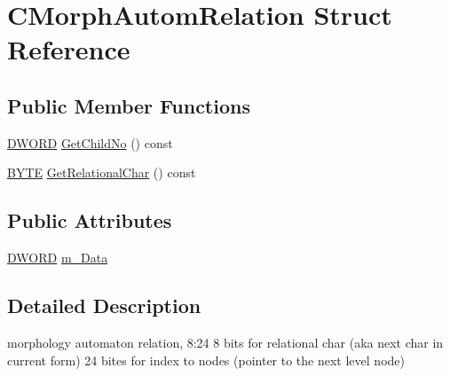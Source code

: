 \hypertarget{structCMorphAutomRelation}{\section{C\-Morph\-Autom\-Relation Struct Reference}
\label{structCMorphAutomRelation}
}
\subsection*{Public Member Functions}
\begin{DoxyCompactItemize}
\item 
\hyperlink{sphinxstd_8h_a798af1e30bc65f319c1a246cecf59e39}{D\-W\-O\-R\-D} \hyperlink{structCMorphAutomRelation_a7b515e898722b2a93acf82d0ebaad702}{Get\-Child\-No} () const 
\item 
\hyperlink{sphinxstd_8h_a4ae1dab0fb4b072a66584546209e7d58}{B\-Y\-T\-E} \hyperlink{structCMorphAutomRelation_a3516b6fb20e3932efe70228eb0cdd80b}{Get\-Relational\-Char} () const 
\end{DoxyCompactItemize}
\subsection*{Public Attributes}
\begin{DoxyCompactItemize}
\item 
\hyperlink{sphinxstd_8h_a798af1e30bc65f319c1a246cecf59e39}{D\-W\-O\-R\-D} \hyperlink{structCMorphAutomRelation_a3d10b3cf6c6da33ceea52a628d6ec90d}{m\-\_\-\-Data}
\end{DoxyCompactItemize}


\subsection{Detailed Description}
morphology automaton relation, 8\-:24 8 bits for relational char (aka next char in current form) 24 bites for index to nodes (pointer to the next level node) 

